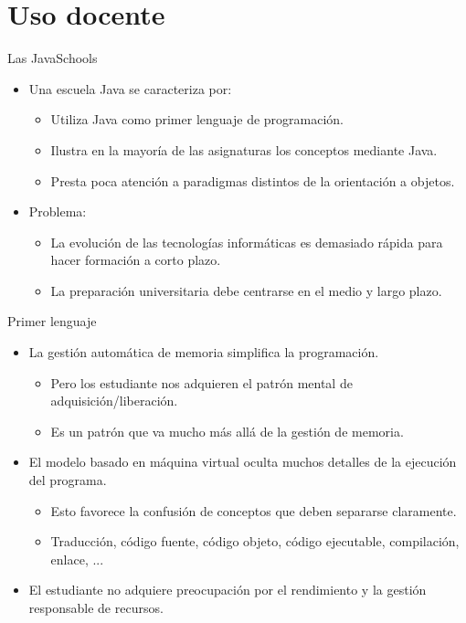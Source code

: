 \section{Uso docente}

\begin{frame}[t]{Las JavaSchools}
  \begin{itemize}
    \item Una escuela Java se caracteriza por:
      \begin{itemize}
        \item Utiliza Java como primer lenguaje de programación.
        \item Ilustra en la mayoría de las asignaturas los conceptos mediante Java.
        \item Presta poca atención a paradigmas distintos de la orientación a objetos.
      \end{itemize}
    \pause
    \item Problema:
      \begin{itemize}
        \item La evolución de las tecnologías informáticas es demasiado rápida para hacer formación a corto plazo.
        \item La preparación universitaria debe centrarse en el medio y largo plazo.
      \end{itemize}
  \end{itemize}
\end{frame}

\begin{frame}[t]{Primer lenguaje}
  \begin{itemize}
    \item La gestión automática de memoria simplifica la programación.
      \begin{itemize}
        \item Pero los estudiante nos adquieren el patrón mental de adquisición/liberación.
        \item Es un patrón que va mucho más allá de la gestión de memoria.
      \end{itemize}
    \item \pause El modelo basado en máquina virtual oculta muchos detalles de la ejecución del programa.
      \begin{itemize}
        \item Esto favorece la confusión de conceptos que deben separarse claramente.
        \item Traducción, código fuente, código objeto, código ejecutable, compilación, enlace, ...
      \end{itemize}
    \item \pause El estudiante no adquiere preocupación por el rendimiento y la gestión responsable de recursos.
  \end{itemize}
\end{frame}

